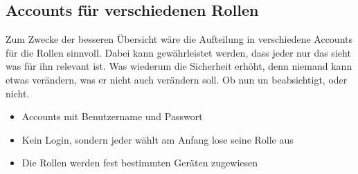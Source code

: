 \subsection{Accounts für verschiedenen Rollen}
Zum Zwecke der besseren Übersicht wäre die Aufteilung in verschiedene Accounts für die Rollen sinnvoll.  
Dabei kann gewährleistet werden, dass jeder nur das sieht was für ihn relevant ist. Was wiederum die Sicherheit erhöht,  
denn niemand kann etwas verändern, was er nicht auch verändern soll. Ob nun un beabsichtigt, oder nicht.  \\
\begin{itemize}  
\item Accounts mit Benutzername und Passwort
\item Kein Login, sondern jeder wählt am Anfang lose seine Rolle aus 
\item Die Rollen werden fest bestimmten Geräten zugewiesen
\end{itemize}